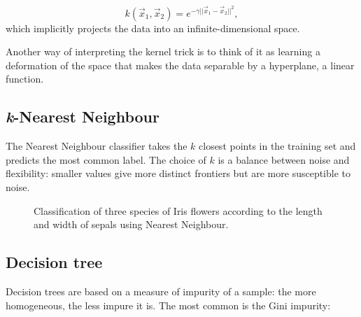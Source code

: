 \[k(\vec{x}_1, \vec{x}_2) = e^{-\gamma ||\vec{x}_1 - \vec{x}_2||^2 },\]
which implicitly projects the data into an infinite-dimensional space.

Another way of interpreting the kernel trick is to think of it as learning a deformation of the space that makes the data separable by a hyperplane, a linear function.

\subsection{\emph{k}-Nearest Neighbour}
The Nearest Neighbour classifier takes the $k$ closest points in the training set and predicts the most common label.
The choice of $k$ is a balance between noise and flexibility: smaller values give more distinct frontiers but are more susceptible to noise.

\begin{figure}[htb]
	\centering
	\hfill
	\caption{Classification of three species of Iris flowers according to the length and width of sepals using Nearest Neighbour.}\label{fig:knn}
\end{figure}

\subsection{Decision tree}\label{sec:decision_tree}
Decision trees are based on a measure of impurity of a sample: the more homogeneous, the less impure it is.
The most common is the Gini impurity:

